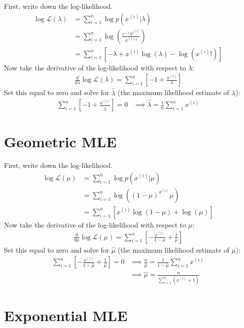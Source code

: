 First, write down the log-likelihood.
\begin{align*}
\log \mathcal{L}(\lambda) &= \sum_{i=1}^n \log p(x^{(i)}|\lambda) \\
&= \sum_{i=1}^n \log \left( \frac{e^{-\lambda} \lambda^{x^{(i)}}}{x^{(i)}!} \right) \\
&= \sum_{i=1}^n \left[ -\lambda + x^{(i)} \log(\lambda) - \log(x^{(i)}!) \right] \end{align*}
Now take the derivative of the log-likelihood with respect to $\lambda$:
\begin{align*}
\frac{d}{d \lambda} \log \mathcal{L}(\lambda) = \sum_{i=1}^n \left[ -1 + \frac{x^{(i)}}{\lambda} \right]
\end{align*}
Set this equal to zero and solve for $\hat{\lambda}$ (the maximum likelihood estimate of $\lambda$):
\begin{align*} \sum_{i=1}^n \left[ -1 + \frac{x^{(i)}}{\hat{\lambda}} \right] = 0 & \implies \boxed{\hat{\lambda} = \frac{1}{n} \sum_{i=1}^n x^{(i)}} \end{align*}

\section{Geometric MLE}

First, write down the log-likelihood.
\begin{align*}
\log \mathcal{L}(\mu) &= \sum_{i=1}^n \log p(x^{(i)}|\mu) \\
&= \sum_{i=1}^n \log \left( (1-\mu)^{x^{(i)}} \mu \right) \\
&= \sum_{i=1}^n \left[ x^{(i)} \log(1-\mu) + \log(\mu) \right] \end{align*}
Now take the derivative of the log-likelihood with respect to $\mu$:
\begin{align*}
\frac{d}{d \mu} \log \mathcal{L}(\mu) = \sum_{i=1}^n \left[ -\frac{x^{(i)}}{1-\mu} + \frac{1}{\mu} \right]
\end{align*}
Set this equal to zero and solve for $\hat{\mu}$ (the maximum likelihood estimate of $\mu$):
\begin{align*} \sum_{i=1}^n \left[ -\frac{x^{(i)}}{1-\hat{\mu}} + \frac{1}{\hat{\mu}} \right] = 0 & \implies \frac{n}{\hat{\mu}} = \frac{1}{1 - \hat{\mu}} \sum_{i=1}^n x^{(i)} \\
& \implies \boxed{\hat{\mu} = \frac{n}{\sum_{i=1}^n (x^{(i)}+1)} }\end{align*}

\section{Exponential MLE}

